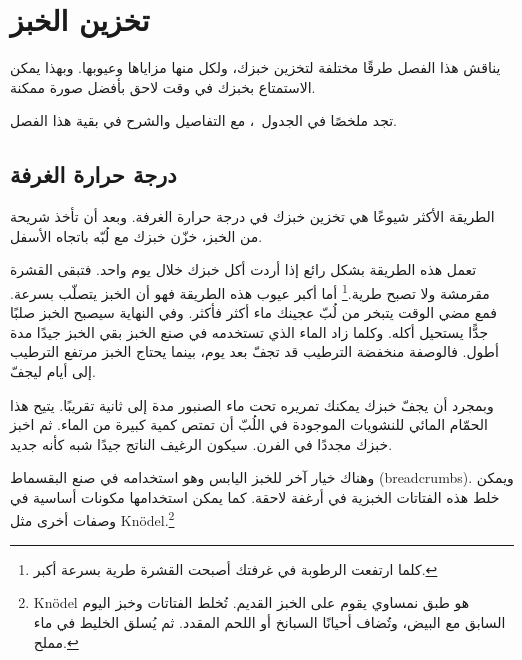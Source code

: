 \chapter{تخزين الخبز}\label{ch:storing-bread}

\begin{quoting}
يناقش هذا الفصل طرقًا مختلفة لتخزين خبزك، ولكل منها مزاياها وعيوبها. وبهذا يمكن الاستمتاع بخبزك في وقت لاحق بأفضل صورة ممكنة.
\end{quoting}

تجد ملخصًا في الجدول~\LR{\ref{table:bread-storage}}، مع التفاصيل والشرح في بقية هذا الفصل.
\begin{table}[!htb]
    \centering
        
        \caption[خيارات تخزين الخبز]{جدول يوضح مزايا وعيوب خيارات تخزين الخبز المختلفة.}%
        \label{table:bread-storage}
\end{table}

\section{درجة حرارة الغرفة}

الطريقة الأكثر شيوعًا هي تخزين خبزك في درجة حرارة الغرفة. وبعد أن تأخذ شريحة من الخبز، خزّن خبزك مع لُبّه باتجاه الأسفل.

تعمل هذه الطريقة بشكل رائع إذا أردت أكل خبزك خلال يوم واحد. فتبقى القشرة مقرمشة ولا تصبح طرية.\footnote{كلما ارتفعت الرطوبة في غرفتك أصبحت القشرة طرية بسرعة أكبر.} أما أكبر عيوب هذه الطريقة فهو أن الخبز يتصلّب بسرعة. فمع مضي الوقت يتبخر من لُبّ عجينك ماء أكثر فأكثر. وفي النهاية سيصبح الخبز صلبًا جدًّا يستحيل أكله. وكلما زاد الماء الذي تستخدمه في صنع الخبز بقي الخبز جيدًا مدة أطول. فالوصفة منخفضة الترطيب قد تجفّ بعد  يوم، بينما يحتاج الخبز مرتفع الترطيب إلى  أيام ليجفّ.

وبمجرد أن يجفّ خبزك يمكنك تمريره تحت ماء الصنبور مدة  إلى  ثانية تقريبًا. يتيح هذا الحمّام المائي للنشويات الموجودة في اللُبّ أن تمتص كمية كبيرة من الماء. ثم اخبز خبزك مجددًا في الفرن. سيكون الرغيف الناتج جيدًا شبه كأنه جديد.

وهناك خيار آخر للخبز اليابس وهو استخدامه في صنع البقسماط \textenglish{(breadcrumbs)}. ويمكن خلط هذه الفتاتات الخبزية في أرغفة لاحقة. كما يمكن استخدامها مكونات أساسية في وصفات أخرى مثل \textenglish{Knödel}.\footnote{\textenglish{Knödel} هو طبق نمساوي يقوم على الخبز القديم. تُخلط الفتاتات وخبز اليوم السابق مع البيض، وتُضاف أحيانًا السبانخ أو اللحم المقدد. ثم يُسلق الخليط في ماء مملح.}

